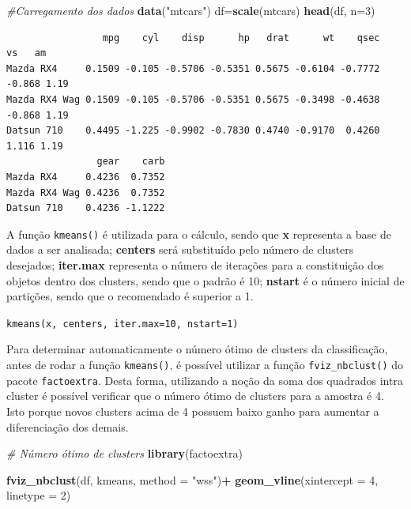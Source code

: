 \documentclass[12pt,brazil,oneside]{book}
\newenvironment{Shaded}{\begin{snugshade}}{\end{snugshade}}
\newcommand{\CommentTok}[1]{\textcolor[rgb]{0.56,0.35,0.01}{\textit{#1}}}
\newcommand{\DataTypeTok}[1]{\textcolor[rgb]{0.13,0.29,0.53}{#1}}
\newcommand{\DecValTok}[1]{\textcolor[rgb]{0.00,0.00,0.81}{#1}}
\newcommand{\KeywordTok}[1]{\textcolor[rgb]{0.13,0.29,0.53}{\textbf{#1}}}
\newcommand{\NormalTok}[1]{#1}
\newcommand{\OperatorTok}[1]{\textcolor[rgb]{0.81,0.36,0.00}{\textbf{#1}}}
\newcommand{\StringTok}[1]{\textcolor[rgb]{0.31,0.60,0.02}{#1}}
\begin{document}
\begin{Shaded}
\begin{Highlighting}[]
\CommentTok{#Carregamento dos dados}
\KeywordTok{data}\NormalTok{(}\StringTok{"mtcars"}\NormalTok{)}
\NormalTok{df=}\KeywordTok{scale}\NormalTok{(mtcars)}
\KeywordTok{head}\NormalTok{(df, }\DataTypeTok{n=}\DecValTok{3}\NormalTok{)}
\end{Highlighting}
\end{Shaded}

\begin{verbatim}
                 mpg    cyl    disp      hp   drat      wt    qsec     vs   am
Mazda RX4     0.1509 -0.105 -0.5706 -0.5351 0.5675 -0.6104 -0.7772 -0.868 1.19
Mazda RX4 Wag 0.1509 -0.105 -0.5706 -0.5351 0.5675 -0.3498 -0.4638 -0.868 1.19
Datsun 710    0.4495 -1.225 -0.9902 -0.7830 0.4740 -0.9170  0.4260  1.116 1.19
                gear    carb
Mazda RX4     0.4236  0.7352
Mazda RX4 Wag 0.4236  0.7352
Datsun 710    0.4236 -1.1222
\end{verbatim}

A função \texttt{kmeans()} é utilizada para o cálculo, sendo que \textbf{x} representa a base de dados a ser analisada; \textbf{centers} será substituído pelo número de clusters desejados; \textbf{iter.max} representa o número de iterações para a constituição dos objetos dentro dos clusters, sendo que o padrão é 10; \textbf{nstart} é o número inicial de partições, sendo que o recomendado é superior a 1.

\texttt{kmeans(x,\ centers,\ iter.max=10,\ nstart=1)}

Para determinar automaticamente o número ótimo de clusters da classificação, antes de rodar a função \texttt{kmeans()}, é possível utilizar a função \texttt{fviz\_nbclust()} do pacote \texttt{factoextra}. Desta forma, utilizando a noção da soma dos quadrados intra cluster é possível verificar que o número ótimo de clusters para a amostra é 4. Isto porque novos clusters acima de 4 possuem baixo ganho para aumentar a diferenciação dos demais.

\begin{Shaded}
\begin{Highlighting}[]
\CommentTok{# Número ótimo de clusters}
\KeywordTok{library}\NormalTok{(factoextra)}

\KeywordTok{fviz_nbclust}\NormalTok{(df, kmeans, }\DataTypeTok{method =} \StringTok{"wss"}\NormalTok{)}\OperatorTok{+}
\StringTok{  }\KeywordTok{geom_vline}\NormalTok{(}\DataTypeTok{xintercept =} \DecValTok{4}\NormalTok{, }\DataTypeTok{linetype =} \DecValTok{2}\NormalTok{)}
\end{Highlighting}
\end{Shaded}
\end{document}
